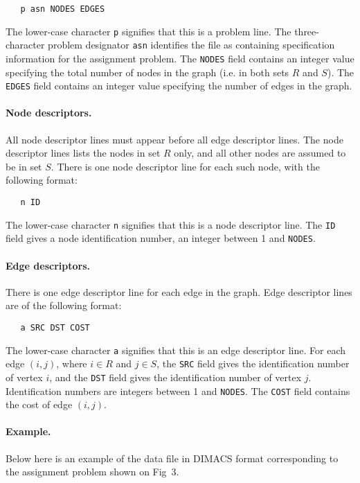 \documentclass[dvipdfm,11pt]{report}
\begin{document}
\begin{verbatim}
   p asn NODES EDGES
\end{verbatim}

\noindent
The lower-case character \verb|p| signifies that this is a problem line.
The three-character problem designator \verb|asn| identifies the file as
containing specification information for the assignment problem.
The \verb|NODES| field contains an integer value specifying the total
number of nodes in the graph (i.e. in both sets $R$ and $S$). The
\verb|EDGES| field contains an integer value specifying the number of
edges in the graph.

\paragraph{Node descriptors.} All node descriptor lines must appear
before all edge descriptor lines. The node descriptor lines lists the
nodes in set $R$ only, and all other nodes are assumed to be in set
$S$. There is one node descriptor line for each such node, with the
following format:

\begin{verbatim}
   n ID
\end{verbatim}

\noindent
The lower-case character \verb|n| signifies that this is a node
descriptor line. The \verb|ID| field gives a node identification number,
an integer between 1 and \verb|NODES|.

\paragraph{Edge descriptors.} There is one edge descriptor line for
each edge in the graph. Edge descriptor lines are of the following
format:

\begin{verbatim}
   a SRC DST COST
\end{verbatim}

\noindent
The lower-case character \verb|a| signifies that this is an edge
descriptor line. For each edge $(i,j)$, where $i\in R$ and $j\in S$,
the \verb|SRC| field gives the identification number of vertex $i$, and
the \verb|DST| field gives the identification number of vertex $j$.
Identification numbers are integers between 1 and \verb|NODES|. The
\verb|COST| field contains the cost of edge $(i,j)$.

\paragraph{Example.} Below here is an example of the data file in
DIMACS format corresponding to the assignment problem shown on Fig~3.
\end{document}
